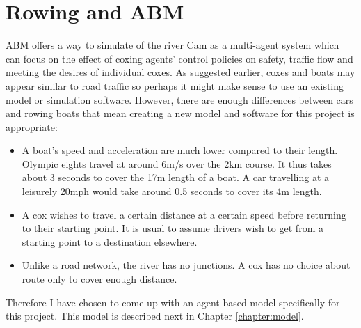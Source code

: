     \section{Rowing and ABM}
    ABM offers a way to simulate of the river Cam as a multi-agent system which can focus on the effect of coxing agents' control policies on safety, traffic flow and meeting the desires of individual coxes. As suggested earlier, coxes and boats may appear similar to road traffic so perhaps it might make sense to use an existing model or simulation software. However, there are enough differences between cars and rowing boats that mean creating a new model and software for this project is appropriate:
    
      \begin{itemize}
        \item A boat's speed and acceleration are much lower compared to their length. Olympic eights travel at around 6m/s over the 2km course. It thus takes about 3 seconds to cover the 17m length of a boat. A car travelling at a leisurely 20mph would take around 0.5 seconds to cover its 4m length.
        
        \item A cox wishes to travel a certain distance at a certain speed before returning to their starting point. It is usual to assume drivers wish to get from a starting point to a destination elsewhere. 
        
        \item Unlike a road network, the river has no junctions. A cox has no choice about route only to cover enough distance.
      \end{itemize}
  
  Therefore I have chosen to come up with an agent-based model specifically for this project. This model is described next in Chapter \ref{chapter:model}.
  